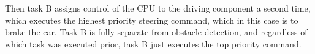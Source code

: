 Then task B assigns control of the CPU to the driving component a second time, which executes the highest priority steering command, which in this case is to brake the car. Task B is fully separate from obstacle detection, and regardless of which task was executed prior, task B just executes the top priority command. 








